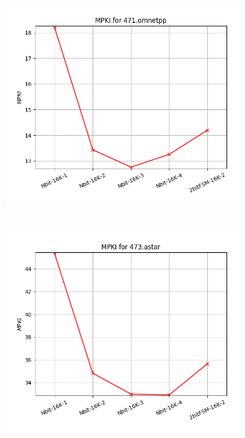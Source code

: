    \begin{minipage}{\textwidth}
      \begin{center}
         \\
         \vspace{3mm}
         \includegraphics[width=0.65\textwidth, frame]{./graphs/4-2i/471-omnetpp.png}
         \vspace{6mm}
      \end{center}
   \end{minipage}

   \begin{minipage}{\textwidth}
      \begin{center}
         \\
         \vspace{3mm}
         \includegraphics[width=0.65\textwidth, frame]{./graphs/4-2i/473-astar.png}
         \vspace{6mm}
      \end{center}
   \end{minipage}

